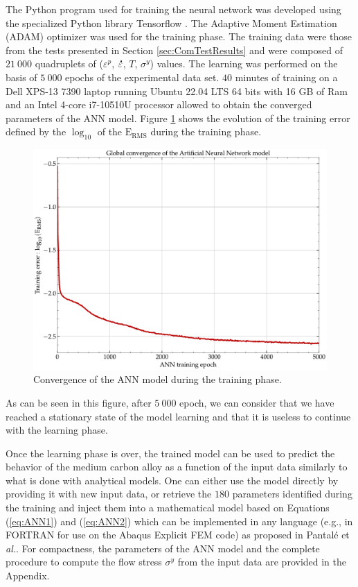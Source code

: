 \documentclass[twoside,english,1p,final,sort&compress]{elsarticle}
\makeatletter
\theoremstyle{plain}
\DeclareRobustCommand{\mdot}[1]{\accentset{\mbox{\bfseries .}}{#1}}
\DeclareRobustCommand{\eal}{et \emph{al.}\@\xspace}
\DeclareRobustCommand{\eg}{e.g.,\@\xspace}
\DeclareRobustCommand{\RMSE}{\text{E}_\text{RMS}}
\makeatother
\begin{document}
The Python program used for training the neural network was developed using the specialized Python library Tensorflow \cite{Abadi-2016}.
The Adaptive Moment Estimation (ADAM) optimizer \cite{Kingma-2015} was used for the training phase.
The training data were those from the tests presented in Section \ref{sec:ComTestResults} and were composed of $21~000$ quadruplets of ($\varepsilon^p$, $\mdot\varepsilon$, $T$, $\sigma^y$) values.
The learning was performed on the basis of $5~000$ epochs of the experimental data set.
$40$ minutes of training on a Dell XPS-13 7390 laptop running Ubuntu 22.04 LTS 64 bits with 16 GB of Ram and an Intel 4-core i7-10510U processor allowed to obtain the converged parameters of the ANN model.
Figure \ref{fig:ANN-6-conv} shows the evolution of the training error defined by the $\log_{10}$ of the $\RMSE$  during the training phase.
\begin{figure}[!ht]
\centering
\includegraphics[width=0.7\columnwidth]
{Figures/Conv-ANN-6}
\caption{Convergence of the ANN model during the training phase.}
\label{fig:ANN-6-conv}
\end{figure}
As can be seen in this figure, after $5~000$ epoch, we can consider that we have reached a stationary state of the model learning and that it is useless to continue with the learning phase.

Once the learning phase is over, the trained model can be used to predict the behavior of the medium carbon alloy as a function of the input data similarly to what is done with analytical models.
One can either use the model directly by providing it with new input data, or retrieve the $180$ parameters identified during the training and inject them into a mathematical model based on Equations (\ref{eq:ANN1}) and (\ref{eq:ANN2}) which can be implemented in any language (\eg in FORTRAN for use on the Abaqus Explicit FEM code) as proposed in Pantalé \eal \cite{Pantale-2021}.
For compactness, the parameters of the ANN model and the complete procedure to compute the flow stress $\sigma^y$ from the input data are provided in the Appendix.
\end{document}
